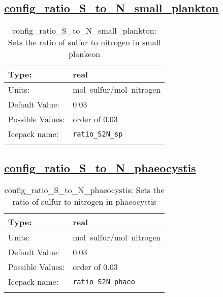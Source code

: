 \subsection[config\_ratio\_S\_to\_N\_small\_plankton]{\hyperref[sec:nm_tab_biogeochemistry]{config\_ratio\_S\_to\_N\_small\_plankton}}
\label{subsec:nm_sec_config_ratio_S_to_N_small_plankton}
\begin{center}
\begin{longtable}{| p{2.0in} || p{4.0in} |}
    \hline
    Type: & real \\
    \hline
    Units: & \si{mol.sulfur/mol.nitrogen} \\
    \hline
    Default Value: & 0.03 \\
    \hline
    Possible Values: & order of 0.03 \\
    \hline
    \hline
    Icepack name: & \verb+ratio_S2N_sp+ \\
    \caption{config\_ratio\_S\_to\_N\_small\_plankton: Sets the ratio of sulfur to nitrogen in small plankeon}
\end{longtable}
\end{center}
\subsection[config\_ratio\_S\_to\_N\_phaeocystis]{\hyperref[sec:nm_tab_biogeochemistry]{config\_ratio\_S\_to\_N\_phaeocystis}}
\label{subsec:nm_sec_config_ratio_S_to_N_phaeocystis}
\begin{center}
\begin{longtable}{| p{2.0in} || p{4.0in} |}
    \hline
    Type: & real \\
    \hline
    Units: & \si{mol.sulfur/mol.nitrogen} \\
    \hline
    Default Value: & 0.03 \\
    \hline
    Possible Values: & order of 0.03 \\
    \hline
    \hline
    Icepack name: & \verb+ratio_S2N_phaeo+ \\
    \caption{config\_ratio\_S\_to\_N\_phaeocystis: Sets the ratio of sulfur to nitrogen in phaeocystis}
\end{longtable}
\end{center}
